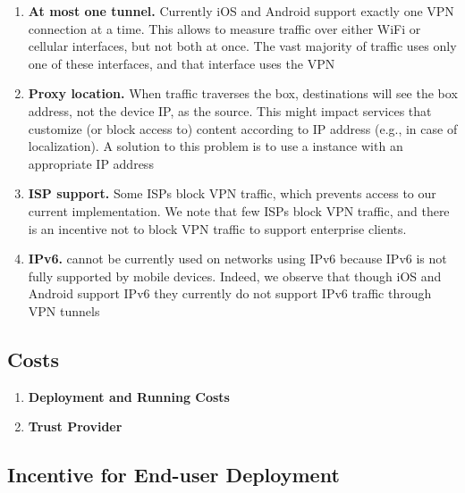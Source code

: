\begin{enumerate}

\item \textbf{At most one tunnel.}
Currently iOS and Android support exactly one VPN connection at a time. 
This allows \meddle{} to measure traffic over either WiFi or cellular interfaces, but not both at once.
The vast majority of traffic uses only one of these interfaces, and that interface uses the VPN

\item \textbf{Proxy location.} 
When traffic traverses the \meddle{} box, destinations will see the \meddle{} box address, not the device IP, as the source. 
This might impact services  that customize (or block access to) content according to IP address (e.g., in case of localization). 
A solution to this problem is to use a \meddle{} instance with an appropriate IP address

\item \textbf{ISP support.}
Some ISPs block VPN traffic, which prevents access to our current \meddle implementation. 
We note that few ISPs block VPN traffic, and there is an incentive not to block VPN traffic to support enterprise clients.

\item \textbf{IPv6.}
\meddle{} cannot be currently used on networks using IPv6 because IPv6 is not fully supported by mobile devices. 
Indeed, we observe that though iOS and Android support IPv6 they currently do not support IPv6 traffic through VPN tunnels



\end{enumerate}

\subsection{Costs}

\begin{enumerate}

\item \textbf{Deployment and Running Costs}

\item \textbf{Trust Provider}

\end{enumerate}

\subsection{Incentive for End-user Deployment}

